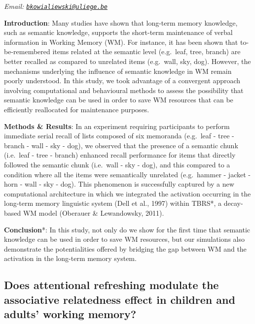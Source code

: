 \documentclass[
  12pt,
]{book}
\begin{document}
\emph{Email: \href{mailto:bkowialiewski@uliege.be}{\nolinkurl{bkowialiewski@uliege.be}}}

\textbf{Introduction}: Many studies have shown that long-term memory knowledge, such as semantic knowledge, supports the short-term maintenance of verbal information in Working Memory (WM). For instance, it has been shown that to-be-remembered items related at the semantic level (e.g.~leaf, tree, branch) are better recalled as compared to unrelated items (e.g.~wall, sky, dog). However, the mechanisms underlying the influence of semantic knowledge in WM remain poorly understood. In this study, we took advantage of a convergent approach involving computational and behavioural methods to assess the possibility that semantic knowledge can be used in order to save WM resources that can be efficiently reallocated for maintenance purposes.

\textbf{Methods \& Results}: In an experiment requiring participants to perform immediate serial recall of lists composed of six memoranda (e.g.~leaf - tree - branch - wall - sky - dog), we observed that the presence of a semantic chunk (i.e.~leaf - tree - branch) enhanced recall performance for items that directly followed the semantic chunk (i.e.~wall - sky - dog), and this compared to a condition where all the items were semantically unrelated (e.g.~hammer - jacket - horn - wall - sky - dog). This phenomenon is successfully captured by a new computational architecture in which we integrated the activation occurring in the long-term memory linguistic system (Dell et al., 1997) within TBRS*, a decay-based WM model (Oberauer \& Lewandowsky, 2011).

\textbf{Conclusion}*: In this study, not only do we show for the first time that semantic knowledge can be used in order to save WM resources, but our simulations also demonstrate the potentialities offered by bridging the gap between WM and the activation in the long-term memory system.

\hypertarget{does-attentional-refreshing-modulate-the-associative-relatedness-effect-in-children-and-adults-working-memory}{%
\subsection{Does attentional refreshing modulate the associative relatedness effect in children and adults' working memory?}\label{does-attentional-refreshing-modulate-the-associative-relatedness-effect-in-children-and-adults-working-memory}}
\end{document}
